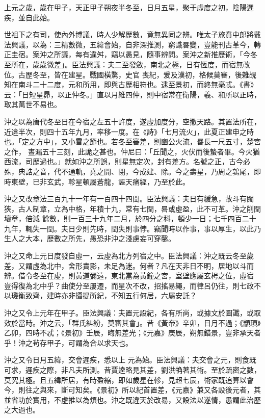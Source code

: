 \begin{pinyinscope}
 上元之歲，歲在甲子，天正甲子朔夜半冬至，日月五星，聚于虛度之初，陰陽遲疾，並自此始。



 世祖下之有司，使內外博議，時人少解歷數，竟無異同之辨。唯太子旅賁中郎將戴法興議，以為：三精數微，五緯會始，自非深推測，窮識晷變，豈能刊古革今，轉正圭宿。案沖之所議，每有違舛，竊以愚見，隨事辨問。案沖之新推歷術，「今冬至所在，歲歲微差」。臣法興議：夫二至發斂，南北之極，日有恆度，而宿無改位。古歷冬至，皆在建星。戰國橫騖，史官
 喪紀，爰及漢初，格候莫審，後雜覘知在南斗二十二度，元和所用，即與古歷相符也。逮至景初，而終無毫忒。《書》云：「日短星昴，以正仲冬。」直以月維四仲，則中宿常在衛陽，羲、和所以正時，取其萬世不易也。



 沖之以為唐代冬至日在今宿之左五十許度，遂虛加度分，空撤天路。其置法所在，近違半次，則四十五年九月，率移一度。在《詩》「七月流火」，此夏正建申之時也。「定之方中」，又小雪之節也。若冬至審差，則豳公火流，晷長一尺五寸，楚宮之作，
 晝漏五十三刻，此詭之甚也。仲尼曰：「丘聞之，火伏而後蟄者畢。今火猶西流，司歷過也。」就如沖之所誤，則星無定次，封有差方。名號之正，古今必殊，典誥之音，代不通軌，堯之開、閉，今成建、除。今之壽星，乃周之鶉尾，即時東壁，已非玄武，軫星頓屬蒼龍，誣天痛經，乃至於此。



 沖之又改章法三百九十一年有一百四十四閏。臣法興議：夫日有緩急，故斗有闊狹，古人制章，立為中格，年積十九，常有七閏，晷或虛盈，此不可革。沖之削閏壞章，倍減
 餘數，則一百三十九年二月，於四分之科，頓少一日；七千四百二十九年，輒失一閏。夫日少則先時，閏失則事悖。竊聞時以作事，事以厚生，以此乃生人之大本，歷數之所先，愚恐非沖之淺慮妄可穿鑿。



 沖之又命上元日度發自虛一，云虛為北方列宿之中。臣法興議：沖之既云冬至歲差，又謂虛為北中，舍形責影，未足為迷。何者？凡在天非日不明，居地以斗而辨。借令冬至在虛，則黃道彌遠，東北當為黃鐘之宮，室壁應屬玄枵之位，虛宿
 豈得復為北中乎？曲使分至屢遷，而星次不改，招搖易繩，而律呂仍往，則七政不以璣衡致齊，建時亦非攝提所紀，不知五行何居，六屬安託？



 沖之又令上元年在甲子。臣法興議：夫置元設紀，各有所尚，或據文於圖讖，或取效於當時。沖之云，「群氏糾紛，莫審其會」。昔《黃帝》辛卯，日月不過；《顓頊》乙卯，四時不忒；《景初》壬辰，晦無差光；《元嘉》庚辰，朔無錯景，豈非承天者乎！沖之茍存甲子，可謂為合以求天也。



 沖之又令日月五緯，交會遲疾，悉以上
 元為始。臣法興議：夫交會之元，則食既可求，遲疾之際，非凡夫所測。昔賈逵略見其差，劉洪觕著其術。至於疏密之數，莫究其極。且五緯所居，有時盈縮，即如歲星在軫，見超七辰，術家既追算以會今，則往之與來，斷可知矣。《景初》所以紀首置差，《元嘉》兼又各設後元者，其並省功於實用，不虛推以為煩也。沖之既違天於改易，又設法以遂情，愚謂此治歷之大過也。




\end{pinyinscope}
